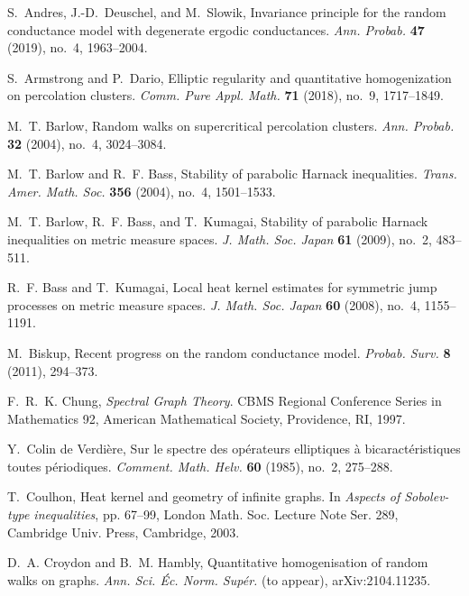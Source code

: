 \documentclass{article}
\numberwithin{equation}{section}
\theoremstyle{definition}
\theoremstyle{remark}
\begin{document}
\begin{thebibliography}{99}

S.~Andres, J.-D.~Deuschel, and M.~Slowik, Invariance principle for the random conductance model with degenerate ergodic conductances.
\emph{Ann. Probab.} \textbf{47} (2019), no.~4, 1963--2004.


S.~Armstrong and P.~Dario, Elliptic regularity and quantitative homogenization on percolation clusters.
\emph{Comm. Pure Appl. Math.} \textbf{71} (2018), no.~9, 1717--1849.

M.~T. Barlow, Random walks on supercritical percolation clusters.
\emph{Ann. Probab.} \textbf{32} (2004), no.~4, 3024--3084.

M.~T. Barlow and R.~F. Bass, Stability of parabolic Harnack inequalities.
\emph{Trans. Amer. Math. Soc.} \textbf{356} (2004), no.~4, 1501--1533.

M.~T. Barlow, R.~F. Bass, and T.~Kumagai, Stability of parabolic Harnack inequalities on metric measure spaces.
\emph{J. Math. Soc. Japan} \textbf{61} (2009), no.~2, 483--511.

R.~F. Bass and T.~Kumagai, Local heat kernel estimates for symmetric jump processes on metric measure spaces.
\emph{J. Math. Soc. Japan} \textbf{60} (2008), no.~4, 1155--1191.

M.~Biskup, Recent progress on the random conductance model.
\emph{Probab. Surv.} \textbf{8} (2011), 294--373.

F.~R.~K. Chung, \emph{Spectral Graph Theory}.
CBMS Regional Conference Series in Mathematics 92, American Mathematical Society, Providence, RI, 1997.

Y.~Colin de Verdière, Sur le spectre des opérateurs elliptiques à bicaractéristiques toutes périodiques.
\emph{Comment. Math. Helv.} \textbf{60} (1985), no.~2, 275--288.

T.~Coulhon, Heat kernel and geometry of infinite graphs.
In \emph{Aspects of Sobolev-type inequalities},
pp. 67--99, London Math. Soc. Lecture Note Ser. 289,
Cambridge Univ. Press, Cambridge, 2003.


D.~A. Croydon and B.~M. Hambly, Quantitative homogenisation of random walks on graphs.
\emph{Ann. Sci. Éc. Norm. Supér.} (to appear), arXiv:2104.11235.


\end{thebibliography}
\end{document}
